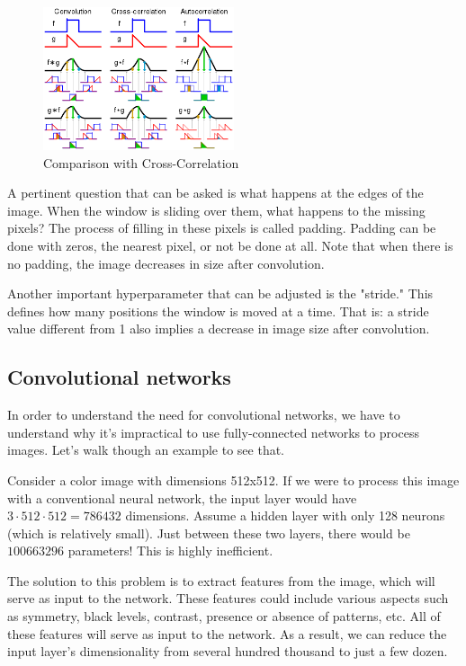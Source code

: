 \begin{figure}[h!]
    \centering
    \includegraphics[width=0.5\textwidth]{figuras/cross-correlation.png}
    \caption{Comparison with Cross-Correlation}
\end{figure}

A pertinent question that can be asked is what happens at the edges of the image. When the window is sliding over them, what happens to the missing pixels? The process of filling in these pixels is called padding. Padding can be done with zeros, the nearest pixel, or not be done at all. Note that when there is no padding, the image decreases in size after convolution.

Another important hyperparameter that can be adjusted is the "stride." This defines how many positions the window is moved at a time. That is: a stride value different from 1 also implies a decrease in image size after convolution.

\subsection{Convolutional networks}

In order to understand the need for convolutional networks, we have to understand why it's impractical to use fully-connected networks to process images. Let's walk though an example to see that. 

Consider a color image with dimensions 512x512. If we were to process this image with a conventional neural network, the input layer would have \( 3 \cdot 512 \cdot 512 = 786432 \) dimensions. Assume a hidden layer with only 128 neurons (which is relatively small). Just between these two layers, there would be \( 100663296 \) parameters! This is highly inefficient.

The solution to this problem is to extract features from the image, which will serve as input to the network. These features could include various aspects such as symmetry, black levels, contrast, presence or absence of patterns, etc. All of these features will serve as input to the network. As a result, we can reduce the input layer's dimensionality from several hundred thousand to just a few dozen.


